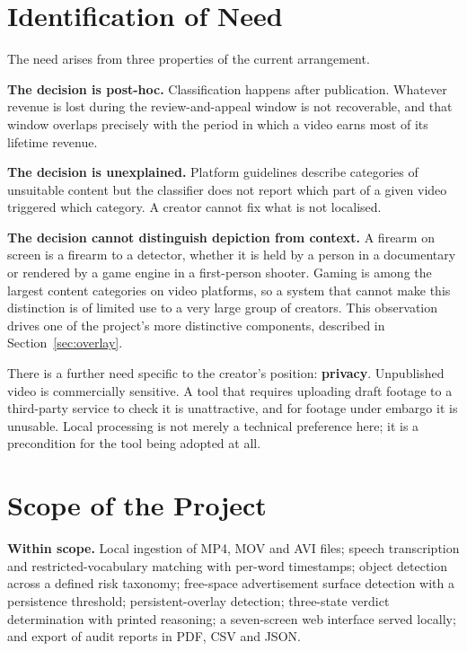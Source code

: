 \documentclass[
12pt,
a4paper,
oneside
]{report}
\begin{document}
\section{Identification of Need}

The need arises from three properties of the current arrangement.

\textbf{The decision is post-hoc.} Classification happens after publication.
Whatever revenue is lost during the review-and-appeal window is not recoverable,
and that window overlaps precisely with the period in which a video earns most
of its lifetime revenue.

\textbf{The decision is unexplained.} Platform guidelines describe categories of
unsuitable content \cite{YouTubeAdFriendly} but the classifier does not report
which part of a given video triggered which category. A creator cannot fix what
is not localised.

\textbf{The decision cannot distinguish depiction from context.} A firearm on
screen is a firearm to a detector, whether it is held by a person in a
documentary or rendered by a game engine in a first-person shooter. Gaming is
among the largest content categories on video platforms, so a system that cannot
make this distinction is of limited use to a very large group of creators. This
observation drives one of the project's more distinctive components, described
in Section~\ref{sec:overlay}.

There is a further need specific to the creator's position: \textbf{privacy}.
Unpublished video is commercially sensitive. A tool that requires uploading
draft footage to a third-party service to check it is unattractive, and for
footage under embargo it is unusable. Local processing is not merely a technical
preference here; it is a precondition for the tool being adopted at all.

\section{Scope of the Project}

\textbf{Within scope.} Local ingestion of MP4, MOV and AVI files; speech
transcription and restricted-vocabulary matching with per-word timestamps;
object detection across a defined risk taxonomy; free-space advertisement
surface detection with a persistence threshold; persistent-overlay detection;
three-state verdict determination with printed reasoning; a seven-screen web
interface served locally; and export of audit reports in PDF, CSV and JSON.
\end{document}
